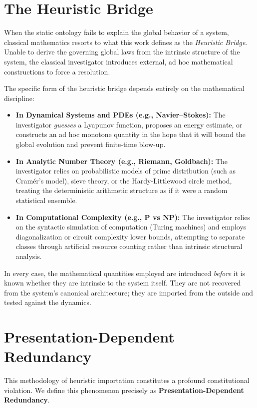 \documentclass[12pt,openany]{extbook}
\theoremstyle{plain}
\theoremstyle{definition}
\begin{document}
\section{The Heuristic Bridge}

When the static ontology fails to explain the global behavior of a system, classical mathematics resorts to what this work defines as the \emph{Heuristic Bridge}. Unable to derive the governing global laws from the intrinsic structure of the system, the classical investigator introduces external, ad hoc mathematical constructions to force a resolution.

The specific form of the heuristic bridge depends entirely on the mathematical discipline:
\begin{itemize}
    \item \textbf{In Dynamical Systems and PDEs (e.g., Navier--Stokes):} The investigator \emph{guesses} a Lyapunov function, proposes an energy estimate, or constructs an ad hoc monotone quantity in the hope that it will bound the global evolution and prevent finite-time blow-up.
    \item \textbf{In Analytic Number Theory (e.g., Riemann, Goldbach):} The investigator relies on probabilistic models of prime distribution (such as Cram\'{e}r's model), sieve theory, or the Hardy-Littlewood circle method, treating the deterministic arithmetic structure as if it were a random statistical ensemble.
    \item \textbf{In Computational Complexity (e.g., P vs NP):} The investigator relies on the syntactic simulation of computation (Turing machines) and employs diagonalization or circuit complexity lower bounds, attempting to separate classes through artificial resource counting rather than intrinsic structural analysis.
\end{itemize}

In every case, the mathematical quantities employed are introduced \emph{before} it is known whether they are intrinsic to the system itself. They are not recovered from the system's canonical architecture; they are imported from the outside and tested against the dynamics.

\section{Presentation-Dependent Redundancy}

This methodology of heuristic importation constitutes a profound constitutional violation. We define this phenomenon precisely as \textbf{Presentation-Dependent Redundancy}.
\end{document}
